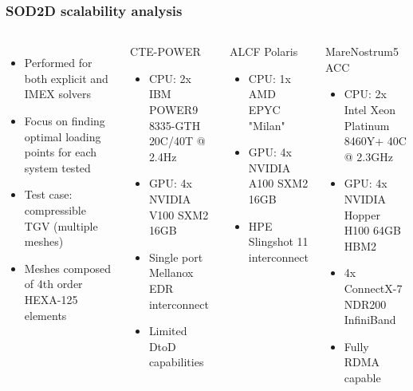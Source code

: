 \begin{frame}
	\frametitle{SOD2D scalability analysis}
	\begin{columns}
		\begin{itemize}
			\item Performed for both explicit and IMEX solvers
			\item Focus on finding optimal loading points for each system tested
			\item Test case: compressible TGV (multiple meshes)
			\item Meshes composed of 4th order HEXA-125 elements
		\end{itemize}

		\begin{block}{CTE-POWER}
			\begin{itemize}
				\item CPU: 2x IBM POWER9 8335-GTH 20C/40T @ 2.4Hz
				\item GPU: 4x NVIDIA V100 SXM2 16GB
				\item Single port Mellanox EDR interconnect
				\item Limited DtoD capabilities
			\end{itemize}
		\end{block}
		\begin{block}{ALCF Polaris}
			\begin{itemize}
				\item CPU: 1x AMD EPYC "Milan"
				\item GPU: 4x NVIDIA A100 SXM2 16GB
				\item HPE Slingshot 11 interconnect
			\end{itemize}
		\end{block}
		\begin{block}{MareNostrum5 ACC}
			\begin{itemize}
				\item CPU: 2x Intel Xeon Platinum 8460Y+ 40C @ 2.3GHz
				\item GPU: 4x NVIDIA Hopper H100 64GB HBM2
				\item 4x ConnectX-7 NDR200 InfiniBand
				\item Fully RDMA capable
			\end{itemize}
		\end{block}
	\end{columns}
\end{frame}

